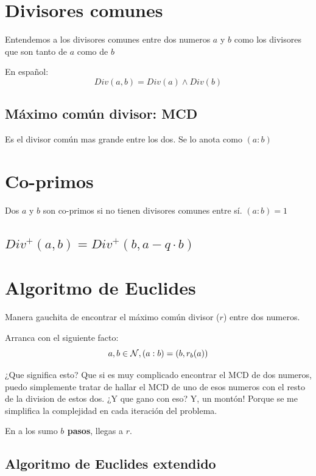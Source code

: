 \documentclass[12pt,a4paper]{report}
\begin{document}
\section{Divisores comunes}
Entendemos a los divisores comunes entre dos numeros $a$ y $b$ como los divisores que son tanto de $a$ como de $b$

En español:
$$
Div(a, b) = Div(a) \land Div(b)
$$

\subsection{Máximo común divisor: MCD}
Es el divisor común mas grande entre los dos.
Se lo anota como $(a : b)$

\section{Co-primos}
Dos $a$ y $b$ son co-primos si no tienen divisores comunes entre sí.
$(a : b) = 1$

\subsection{$Div^+(a,b) = Div^+(b, a - q \cdot b)$}

\section{Algoritmo de Euclides}
Manera gauchita de encontrar el máximo común divisor ($r$) entre dos numeros.

Arranca con el siguiente facto:
$$
a, b \in \mathcal{{N}}, (a : b)  = (b, r_b(a))
$$

¿Que significa esto? Que si es muy complicado encontrar el MCD de dos numeros, puedo simplemente tratar de hallar el MCD de uno de esos numeros con el resto de la division de estos dos.
¿Y que gano con eso? Y, un montón! Porque se me simplifica la complejidad en cada iteración del problema.

En a los sumo \textbf{$b$ pasos}, llegas a $r$.


\subsection{Algoritmo de Euclides extendido}
\end{document}
